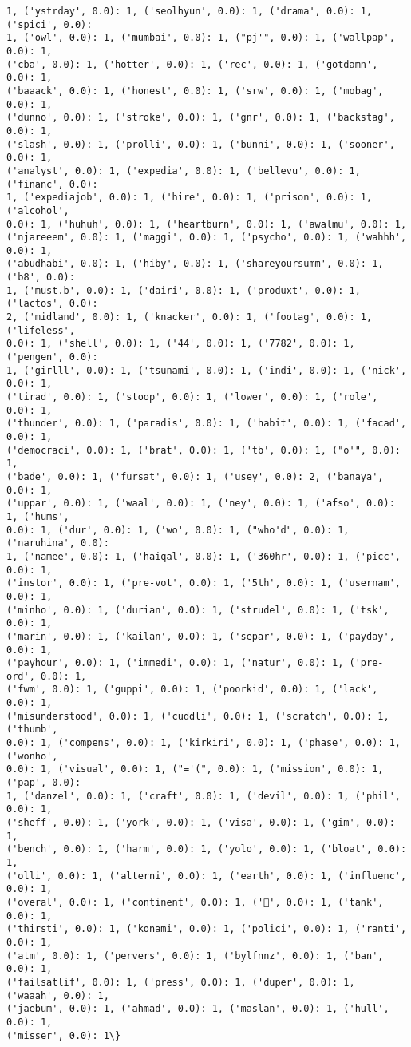 \documentclass[11pt]{article}
\begin{document}
\begin{Verbatim}[commandchars=\\\{\}]
1, ('ystrday', 0.0): 1, ('seolhyun', 0.0): 1, ('drama', 0.0): 1, ('spici', 0.0):
1, ('owl', 0.0): 1, ('mumbai', 0.0): 1, ("pj'", 0.0): 1, ('wallpap', 0.0): 1,
('cba', 0.0): 1, ('hotter', 0.0): 1, ('rec', 0.0): 1, ('gotdamn', 0.0): 1,
('baaack', 0.0): 1, ('honest', 0.0): 1, ('srw', 0.0): 1, ('mobag', 0.0): 1,
('dunno', 0.0): 1, ('stroke', 0.0): 1, ('gnr', 0.0): 1, ('backstag', 0.0): 1,
('slash', 0.0): 1, ('prolli', 0.0): 1, ('bunni', 0.0): 1, ('sooner', 0.0): 1,
('analyst', 0.0): 1, ('expedia', 0.0): 1, ('bellevu', 0.0): 1, ('financ', 0.0):
1, ('expediajob', 0.0): 1, ('hire', 0.0): 1, ('prison', 0.0): 1, ('alcohol',
0.0): 1, ('huhuh', 0.0): 1, ('heartburn', 0.0): 1, ('awalmu', 0.0): 1,
('njareeem', 0.0): 1, ('maggi', 0.0): 1, ('psycho', 0.0): 1, ('wahhh', 0.0): 1,
('abudhabi', 0.0): 1, ('hiby', 0.0): 1, ('shareyoursumm', 0.0): 1, ('b8', 0.0):
1, ('must.b', 0.0): 1, ('dairi', 0.0): 1, ('produxt', 0.0): 1, ('lactos', 0.0):
2, ('midland', 0.0): 1, ('knacker', 0.0): 1, ('footag', 0.0): 1, ('lifeless',
0.0): 1, ('shell', 0.0): 1, ('44', 0.0): 1, ('7782', 0.0): 1, ('pengen', 0.0):
1, ('girlll', 0.0): 1, ('tsunami', 0.0): 1, ('indi', 0.0): 1, ('nick', 0.0): 1,
('tirad', 0.0): 1, ('stoop', 0.0): 1, ('lower', 0.0): 1, ('role', 0.0): 1,
('thunder', 0.0): 1, ('paradis', 0.0): 1, ('habit', 0.0): 1, ('facad', 0.0): 1,
('democraci', 0.0): 1, ('brat', 0.0): 1, ('tb', 0.0): 1, ("o'", 0.0): 1,
('bade', 0.0): 1, ('fursat', 0.0): 1, ('usey', 0.0): 2, ('banaya', 0.0): 1,
('uppar', 0.0): 1, ('waal', 0.0): 1, ('ney', 0.0): 1, ('afso', 0.0): 1, ('hums',
0.0): 1, ('dur', 0.0): 1, ('wo', 0.0): 1, ("who'd", 0.0): 1, ('naruhina', 0.0):
1, ('namee', 0.0): 1, ('haiqal', 0.0): 1, ('360hr', 0.0): 1, ('picc', 0.0): 1,
('instor', 0.0): 1, ('pre-vot', 0.0): 1, ('5th', 0.0): 1, ('usernam', 0.0): 1,
('minho', 0.0): 1, ('durian', 0.0): 1, ('strudel', 0.0): 1, ('tsk', 0.0): 1,
('marin', 0.0): 1, ('kailan', 0.0): 1, ('separ', 0.0): 1, ('payday', 0.0): 1,
('payhour', 0.0): 1, ('immedi', 0.0): 1, ('natur', 0.0): 1, ('pre-ord', 0.0): 1,
('fwm', 0.0): 1, ('guppi', 0.0): 1, ('poorkid', 0.0): 1, ('lack', 0.0): 1,
('misunderstood', 0.0): 1, ('cuddli', 0.0): 1, ('scratch', 0.0): 1, ('thumb',
0.0): 1, ('compens', 0.0): 1, ('kirkiri', 0.0): 1, ('phase', 0.0): 1, ('wonho',
0.0): 1, ('visual', 0.0): 1, ("='(", 0.0): 1, ('mission', 0.0): 1, ('pap', 0.0):
1, ('danzel', 0.0): 1, ('craft', 0.0): 1, ('devil', 0.0): 1, ('phil', 0.0): 1,
('sheff', 0.0): 1, ('york', 0.0): 1, ('visa', 0.0): 1, ('gim', 0.0): 1,
('bench', 0.0): 1, ('harm', 0.0): 1, ('yolo', 0.0): 1, ('bloat', 0.0): 1,
('olli', 0.0): 1, ('alterni', 0.0): 1, ('earth', 0.0): 1, ('influenc', 0.0): 1,
('overal', 0.0): 1, ('continent', 0.0): 1, ('🔫', 0.0): 1, ('tank', 0.0): 1,
('thirsti', 0.0): 1, ('konami', 0.0): 1, ('polici', 0.0): 1, ('ranti', 0.0): 1,
('atm', 0.0): 1, ('pervers', 0.0): 1, ('bylfnnz', 0.0): 1, ('ban', 0.0): 1,
('failsatlif', 0.0): 1, ('press', 0.0): 1, ('duper', 0.0): 1, ('waaah', 0.0): 1,
('jaebum', 0.0): 1, ('ahmad', 0.0): 1, ('maslan', 0.0): 1, ('hull', 0.0): 1,
('misser', 0.0): 1\}
    \end{Verbatim}
\end{document}
